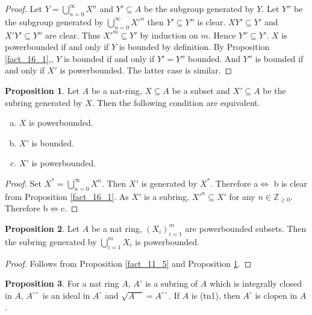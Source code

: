 \documentclass[10pt]{article}
\numberwithin{equation}{section}
\theoremstyle{definition}
\newtheorem{proposition}{Proposition}[subsection]
\newcommand{\Z}[0]{\mathbb{Z}}
\newcommand{\dcirc}[0]{{\circ\circ}}
\begin{document}
\begin{proof}
    Let $Y = \bigcup_{n=0}^\infty X^n$ and $Y'\subseteq A$ be the subgroup generated by $Y$. Let $Y''$ be the subgroup generated by $\bigcup_{n=0}^\infty {X'}^n$ then $Y'\subseteq Y''$ is clear. $XY'\subseteq Y'$ and $X'Y'
     \subseteq Y''$ are clear.
    Thus ${X'}^m\subseteq Y'$ by induction on $m$. Hence $Y''\subseteq Y'$. $X$ is powerbounded if and only if $Y$ is bounded by definition. By Proposition \ref{fact_16_1},, $Y$ is bounded if and only if $Y'= Y''$ bounded. And $Y''$ is bounded if and only if $X'$ is powerbounded. The latter case is similar.
\end{proof}

\begin{proposition}
    \label{fact_16_2}
    Let $A$ be a nat-ring, $X\subseteq A$ be a subset and $X'\subseteq A$ be the subring generated by $X$. Then the following condition are equivalent.
    \begin{enumerate}[a.]
        \item $X$ is powerbounded.
        \item $X'$ is bounded.
        \item $X'$ is powerbounded.
    \end{enumerate}
\end{proposition}
\begin{proof}
    Set $X^* = \bigcup_{n=0}^\infty X^n$. Then $X'$ is generated by $X^*$. Therefore a$\Leftrightarrow$ b is clear from Proposition \ref{fact_16_1}. As $X'$ is a subring, $X'^n\subseteq X'$ for any $n\in\Z_{\geq0}$. Therefore b$\Leftrightarrow$c.
\end{proof}
\begin{proposition}
    \label{fact_16_3}
    Let $A$ be a nat ring, $(X_i)_{i=1}^m$ are powerbounded subsets. Then the subring generated by $\bigcup_{i=1}^mX_i$ is powerbounded.
\end{proposition}
\begin{proof}
    Follows from Proposition \ref{fact_11_5} and Proposition \ref{fact_16_2}.
\end{proof}

\begin{proposition}
    \label{fact_16_5}
    For a nat ring $A$, $A^\circ$ is a subring of $A$ which is integrally closed in $A$, $A^\dcirc$ is an ideal in $A^\circ$ and $\sqrt{A^\dcirc}=A^\dcirc$. If $A$ is (tn1), then $A^\circ$ is clopen in $A$.
\end{proposition}
\end{document}
